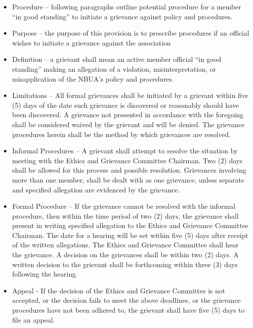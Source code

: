 \documentclass[letterpaper,11pt,colorlinks=true,allcolors=blue]{article}
\begin{document}
\begin{itemize}
\begin{itemize}
\item Procedure – following paragraphs outline potential procedure for a member “in good standing” to initiate a grievance against policy and procedures.
\item Purpose – the purpose of this provision is to prescribe procedures if an official wishes to initiate a grievance against the association
\item Definition – a grievant shall mean an active member official “in good standing” making an allegation of a violation, misinterpretation, or misapplication of the NBUA’s policy and procedures.
\item Limitations – All formal grievances shall be initiated by a grievant within five (5) days of the date such grievance is discovered or reasonably should have been discovered.  A grievance not presented in accordance with the foregoing shall be considered waived by the grievant and will be denied.  The grievance procedures herein shall be the method by which grievances are resolved.
\item Informal Procedures – A grievant shall attempt to resolve the situation by meeting with the Ethics and Grievance Committee Chairman.  Two (2) days shall be allowed for this process and possible resolution.  Grievances involving more than one member, shall be dealt with as one grievance, unless separate and specified allegation are evidenced by the grievance.  
\item Formal Procedure – If the grievance cannot be resolved with the informal procedure, then within the time period of two (2) days, the grievance shall present in writing specified allegation to the Ethics and Grievance Committee Chairman.  The date for a hearing will be set within five (5) days after receipt of the written allegations.  The Ethics and Grievance Committee shall hear the grievance.  A decision on the grievances shall be within two (2) days.  A written decision to the grievant shall be forthcoming within three (3) days following the hearing.
\item Appeal - If the decision of the Ethics and Grievance Committee is not accepted, or the decision fails to meet the above deadlines, or the grievance procedures have not been adhered to, the grievant shall have five (5) days to file an appeal.
\end{itemize}

\end{itemize}

\newpage
\end{document}
